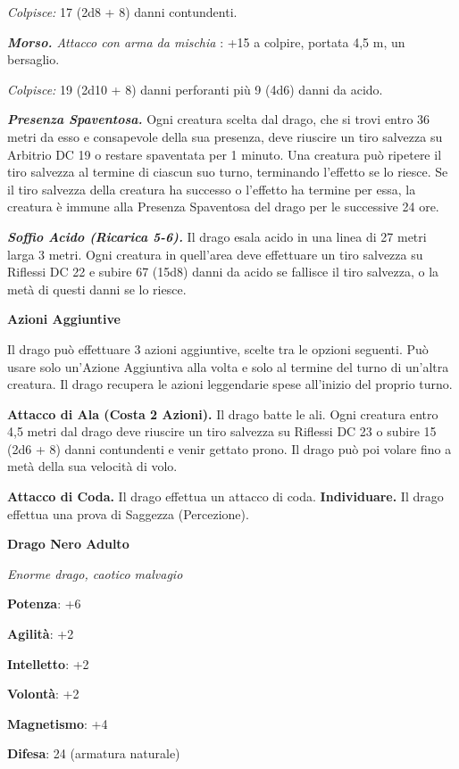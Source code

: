 \begin{multicols}{2}
\emph{Colpisce:} 17 (2d8 + 8) danni contundenti.

\emph{\textbf{Morso.} Attacco con arma da mischia} : +15 a colpire,
portata 4,5 m, un bersaglio.

\emph{Colpisce:} 19 (2d10 + 8) danni perforanti più 9 (4d6) danni da
acido.

\emph{\textbf{Presenza Spaventosa.}} Ogni creatura scelta dal drago, che
si trovi entro 36 metri da esso e consapevole della sua presenza, deve
riuscire un tiro salvezza su Arbitrio DC 19 o restare spaventata per 1
minuto. Una creatura può ripetere il tiro salvezza al termine di ciascun
suo turno, terminando l'effetto se lo riesce. Se il tiro salvezza della
creatura ha successo o l'effetto ha termine per essa, la creatura è
immune alla Presenza Spaventosa del drago per le successive 24 ore.

\emph{\textbf{Soffio Acido (Ricarica 5-6).}} Il drago esala acido in una
linea di 27 metri larga 3 metri. Ogni creatura in quell'area deve
effettuare un tiro salvezza su Riflessi DC 22 e subire 67 (15d8) danni
da acido se fallisce il tiro salvezza, o la metà di questi danni se lo
riesce.

\textbf{Azioni Aggiuntive}

Il drago può effettuare 3 azioni aggiuntive, scelte tra le opzioni
seguenti. Può usare solo un'Azione Aggiuntiva alla volta e solo al
termine del turno di un'altra creatura. Il drago recupera le azioni
leggendarie spese all'inizio del proprio turno.

\textbf{Attacco di Ala (Costa 2 Azioni).} Il drago batte le ali. Ogni
creatura entro 4,5 metri dal drago deve riuscire un tiro salvezza su Riflessi DC 23 o subire 15 (2d6 + 8) danni contundenti e venir gettato
prono. Il drago può poi volare fino a metà della sua velocità di volo.

\textbf{Attacco di Coda.} Il drago effettua un attacco di coda.
\textbf{Individuare.} Il drago effettua una prova di Saggezza
(Percezione).



\textbf{Drago Nero Adulto}

\emph{Enorme drago, caotico malvagio}

\textbf{Potenza}: +6

\textbf{Agilità}: +2

\textbf{Intelletto}: +2

\textbf{Volontà}: +2

\textbf{Magnetismo}: +4

\textbf{Difesa}: 24 (armatura naturale)


\end{multicols}
